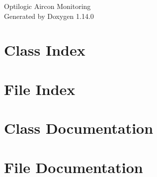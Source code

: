 \documentclass[twoside]{book}
\newcommand{\+}{\discretionary{\mbox{\scriptsize$\hookleftarrow$}}{}{}}
\newcommand{\clearemptydoublepage}{%
    \newpage{\pagestyle{empty}\cleardoublepage}%
  }
\begin{document}
  \raggedbottom
    \hypersetup{pageanchor=false,
                bookmarksnumbered=true,
                pdfencoding=unicode
               }
  \begin{titlepage}
  \vspace*{7cm}
  \begin{center}%
  {\Large Optilogic Aircon Monitoring}\\
  \vspace*{1cm}
  {\large Generated by Doxygen 1.14.0}\\
  \end{center}
  \end{titlepage}
  \clearemptydoublepage
  \tableofcontents
  \clearemptydoublepage
  \hypersetup{pageanchor=true}
\chapter{Class Index}

\chapter{File Index}

\chapter{Class Documentation}


\chapter{File Documentation}





  \backmatter
  \newpage
  \clearemptydoublepage
  \printindex
\end{document}
